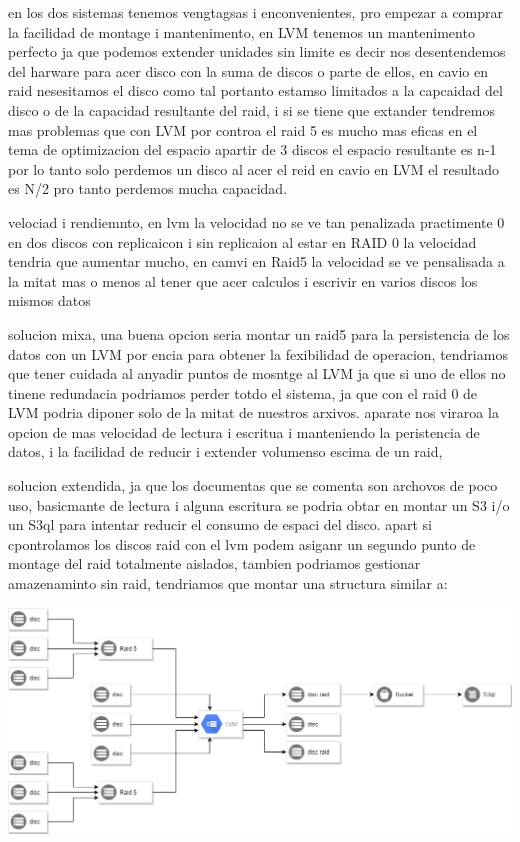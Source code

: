 \documentclass[preprint,11pt]{elsarticle}
\begin{document}
en los dos sistemas tenemos vengtagsas i enconvenientes, pro empezar a comprar la facilidad de montage i mantenimento, en LVM tenemos un mantenimento perfecto ja que podemos extender unidades sin limite es decir nos desentendemos del harware para acer disco con la suma de discos o parte de ellos, en cavio en raid nesesitamos el disco como tal portanto estamso limitados a la capcaidad del disco o de la capacidad resultante del raid, i si se tiene que extander tendremos mas problemas que con LVM por controa el raid 5 es mucho mas eficas en el tema de optimizacion del espacio  apartir de 3 discos el espacio resultante es n-1 por lo tanto solo perdemos un disco al acer el reid en cavio en LVM el resultado es N/2 pro tanto perdemos mucha capacidad.\smallskip

velociad i rendiemnto, en lvm la velocidad no se ve tan penalizada practimente 0 en dos discos con replicaicon i sin replicaion al estar en RAID 0 la velocidad tendria que aumentar mucho, en camvi en Raid5 la velocidad se ve pensalisada a la mitat mas o menos al tener que acer calculos i escrivir en varios discos los mismos datos

solucion mixa, una buena opcion seria montar un raid5 para la persistencia de los datos con un LVM por encia para obtener la fexibilidad de operacion, tendriamos que tener cuidada al anyadir puntos de mosntge al LVM ja que si uno de ellos no tinene redundacia podriamos perder totdo el sistema, ja que con el raid 0 de LVM podria diponer solo de la mitat de nuestros arxivos. aparate nos viraroa la opcion de mas velocidad de lectura i escritua i manteniendo la peristencia de datos, i la facilidad de reducir i extender volumenso escima de un raid, 

solucion extendida, ja que los documentas que se comenta son archovos de poco uso, basicmante de lectura i alguna escritura se podria obtar en montar un S3 i/o un S3ql para intentar reducir el consumo de espaci del disco. apart si cpontrolamos los discos raid con el lvm podem asiganr un segundo punto de montage del raid totalmente aislados, tambien podriamos gestionar amazenaminto sin raid, tendriamos que montar una structura similar a: 

\includegraphics[width=\textwidth]{structure.png}
\end{document}
